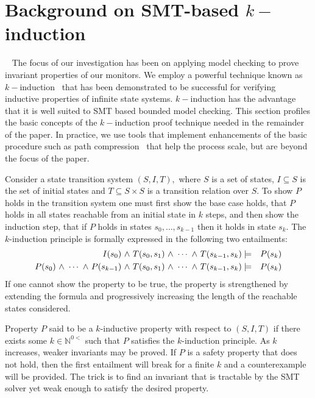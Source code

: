 \section{Background on SMT-based $k-$induction}~\label{sec:background} 
The focus of our  investigation has  been on applying model checking to  prove
invariant properties of our monitors.   We  
employ a powerful technique known as $k-$induction~\cite{Sheeran00,EenS03} that has been demonstrated to be successful for verifying inductive
properties of infinite state systems.   $k-$induction  has the
advantage that it is well suited  to  SMT 
based bounded model checking. This section profiles the
basic concepts of the  $k-$induction proof technique needed in the
remainder of the paper. In practice, we use tools that implement  enhancements of the basic procedure such as path compression~\cite{dMRS03} that help the process scale, but are beyond the focus of the paper. 

Consider  a state transition system  $(S,I,T),$
where $S$ is a set of states, $I \subseteq S$ is the set of initial
states and $T \subseteq S \times S $ is a transition relation over
$S.$ To show $P$ holds in the transition system one must first
show the base case holds, that  $P$ holds in all states reachable
from an initial state in $k$ steps, and then show the induction step,
that if $P$ holds in states $s_0,\ldots,s_{k-1}$ then it holds in
state $s_k.$ The $k$-induction principle is formally expressed in the
following two entailments:
\begin{eqnarray*}
I(s_0) {\ \wedge \ } T(s_0,s_1) {\ \wedge \ } \cdots {\ \wedge \ } T(s_{k-1},s_k) &\models&
P(s_k) \\
P(s_0) {\ \wedge \ } \cdots {\ \wedge \ } P(s_{k-1}) {\ \wedge \ } T(s_0,s_1) {\ \wedge \ } \cdots {\ \wedge \ } T(s_{k-1},s_k) &\models&
P(s_k) 
\end{eqnarray*} 
If one cannot show the property to be true, the
property is strengthened by extending the formula and
progressively increasing the length of the reachable states
considered.  

Property $P$ said to be a $k$-inductive property with respect to
$(S,I,T)$ if there exists some $k \in \mathbb{N}^{0<}$ such that $P$
satisfies the $k$-induction principle. As $k$ increases, weaker
invariants may be proved. If $P$ is a safety property that does not hold, then the first entailment will break for a finite $k$ and a counterexample will be provided. The trick is to find an invariant that is
tractable by the SMT solver yet weak enough to satisfy the desired
property.  
